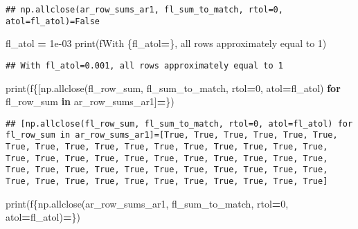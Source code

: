 \documentclass[
]{book}
\newenvironment{Shaded}{\begin{snugshade}}{\end{snugshade}}
\newcommand{\BuiltInTok}[1]{#1}
\newcommand{\ControlFlowTok}[1]{\textcolor[rgb]{0.13,0.29,0.53}{\textbf{#1}}}
\newcommand{\DecValTok}[1]{\textcolor[rgb]{0.00,0.00,0.81}{#1}}
\newcommand{\FloatTok}[1]{\textcolor[rgb]{0.00,0.00,0.81}{#1}}
\newcommand{\KeywordTok}[1]{\textcolor[rgb]{0.13,0.29,0.53}{\textbf{#1}}}
\newcommand{\NormalTok}[1]{#1}
\newcommand{\OperatorTok}[1]{\textcolor[rgb]{0.81,0.36,0.00}{\textbf{#1}}}
\newcommand{\SpecialCharTok}[1]{\textcolor[rgb]{0.00,0.00,0.00}{#1}}
\newcommand{\SpecialStringTok}[1]{\textcolor[rgb]{0.31,0.60,0.02}{#1}}
\begin{document}
\begin{verbatim}
## np.allclose(ar_row_sums_ar1, fl_sum_to_match, rtol=0, atol=fl_atol)=False
\end{verbatim}

\begin{Shaded}
\begin{Highlighting}[]
\NormalTok{fl\_atol }\OperatorTok{=} \FloatTok{1e{-}03}
\BuiltInTok{print}\NormalTok{(}\SpecialStringTok{f\textquotesingle{}With }\SpecialCharTok{\{}\NormalTok{fl\_atol}\OperatorTok{=}\SpecialCharTok{\}}\SpecialStringTok{, all rows approximately equal to 1\textquotesingle{}}\NormalTok{)}
\end{Highlighting}
\end{Shaded}

\begin{verbatim}
## With fl_atol=0.001, all rows approximately equal to 1
\end{verbatim}

\begin{Shaded}
\begin{Highlighting}[]
\BuiltInTok{print}\NormalTok{(}\SpecialStringTok{f\textquotesingle{}}\SpecialCharTok{\{}\NormalTok{[np.allclose(fl\_row\_sum, fl\_sum\_to\_match, rtol}\OperatorTok{=}\DecValTok{0}\NormalTok{, atol}\OperatorTok{=}\NormalTok{fl\_atol) }\ControlFlowTok{for}\NormalTok{ fl\_row\_sum }\KeywordTok{in}\NormalTok{ ar\_row\_sums\_ar1]}\OperatorTok{=}\SpecialCharTok{\}}\SpecialStringTok{\textquotesingle{}}\NormalTok{)}
\end{Highlighting}
\end{Shaded}

\begin{verbatim}
## [np.allclose(fl_row_sum, fl_sum_to_match, rtol=0, atol=fl_atol) for fl_row_sum in ar_row_sums_ar1]=[True, True, True, True, True, True, True, True, True, True, True, True, True, True, True, True, True, True, True, True, True, True, True, True, True, True, True, True, True, True, True, True, True, True, True, True, True, True, True, True, True, True, True, True, True, True, True, True, True, True]
\end{verbatim}

\begin{Shaded}
\begin{Highlighting}[]
\BuiltInTok{print}\NormalTok{(}\SpecialStringTok{f\textquotesingle{}}\SpecialCharTok{\{np.}\NormalTok{allclose(ar\_row\_sums\_ar1, fl\_sum\_to\_match, rtol}\OperatorTok{=}\DecValTok{0}\NormalTok{, atol}\OperatorTok{=}\NormalTok{fl\_atol)}\OperatorTok{=}\SpecialCharTok{\}}\SpecialStringTok{\textquotesingle{}}\NormalTok{)}
\end{Highlighting}
\end{Shaded}
\end{document}
